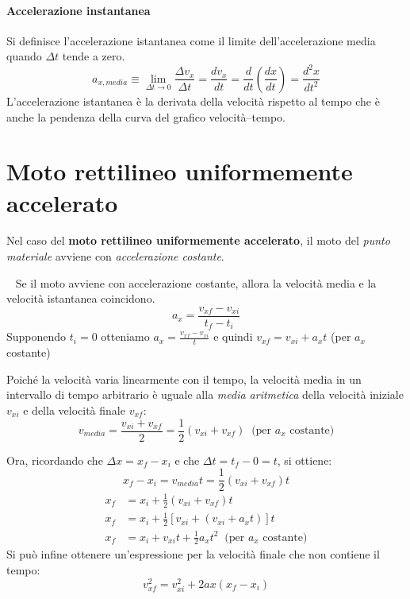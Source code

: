 \documentclass[a4paper,11pt,oneside]{book}
\begin{document}
\paragraph{Accelerazione instantanea} Si definisce l'accelerazione istantanea come il limite dell'accelerazione
media quando $\Delta t$ tende a zero.
\begin{equation*}
    a_{x,media} \equiv \lim_{\Delta t \to 0} \frac{\Delta v_x}{\Delta t} = \frac{dv_x}{dt} = \frac{d}{dt} (\frac{dx}{dt}) = \frac{d^2x}{dt^2}
\end{equation*}
L’accelerazione istantanea è la derivata della velocità rispetto al tempo che è anche la pendenza della curva del grafico velocità–tempo.

\section{Moto rettilineo uniformemente accelerato}
Nel caso del \textbf{moto rettilineo uniformemente accelerato}, il moto del \emph{punto materiale} avviene con \emph{accelerazione costante}.

~\newline
\noindent Se il moto avviene con accelerazione costante, allora la velocità media e la velocità istantanea coincidono.
\begin{equation*}
    a_x = \frac{v_{xf}-v_{xi}}{t_f-t_i}
\end{equation*}
Supponendo $t_i = 0$ otteniamo $a_x = \frac{v_{xf}-v_{xi}}{t}$ e quindi $v_{xf} = v_{xi} + a_x t$ (per $a_x$ costante)

Poiché la velocità varia linearmente con il tempo, la velocità media in un intervallo di tempo
arbitrario è uguale alla \emph{media aritmetica} della velocità iniziale $v_{xi}$ e della velocità finale $v_{xf}$:
\begin{equation*}
    v_{media} = \frac{v_{xi} + v_{xf}}{2} = \frac{1}{2} (v_{xi} + v_{xf}) \; \; \text{(per } a_{x} \text{ costante)}
\end{equation*}

Ora, ricordando che $\Delta x = x_f - x_i$ e che $\Delta t = t_f - 0 = t$, si ottiene:
\begin{equation*}
    x_f - x_i = v_{media} t = \frac{1}{2} (v_{xi} + v_{xf}) t
\end{equation*}
\begin{align*}
    x_f & = x_i + \frac{1}{2} (v_{xi} + v_{xf}) t                                         \\
    x_f & = x_i + \frac{1}{2} [v_{xi} + (v_{xi} + a_x t)] t                               \\
    x_f & = x_i + v_{xi} t + \frac{1}{2} a_x t^2 \; \; \text{(per } a_x \text{ costante)}
\end{align*}
Si può infine ottenere un’espressione per la velocità finale che non contiene il tempo:
\begin{equation*}
    v_{xf}^2 = v_{xi}^2 + 2ax(x_f - x_i)
\end{equation*}
\end{document}
